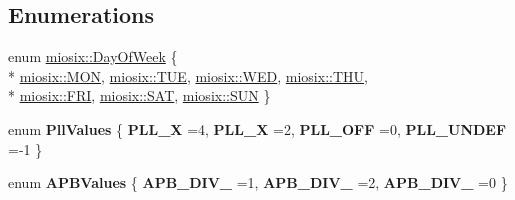 \subsection*{Enumerations}
\begin{DoxyCompactItemize}
\item 
enum \hyperlink{group___hardware_ga24027ab4dbf8557211c0a82fb0dffcbf}{miosix\-::\-Day\-Of\-Week} \{ \\*
\hyperlink{group___hardware_gga24027ab4dbf8557211c0a82fb0dffcbfa962bfb6be11410d30c4406070a19c258}{miosix\-::\-M\-O\-N}, 
\hyperlink{group___hardware_gga24027ab4dbf8557211c0a82fb0dffcbfac3cdcd22d875a6100df4d9b731017962}{miosix\-::\-T\-U\-E}, 
\hyperlink{group___hardware_gga24027ab4dbf8557211c0a82fb0dffcbfab74451ba70e3887ee80b2a610e7ba4a6}{miosix\-::\-W\-E\-D}, 
\hyperlink{group___hardware_gga24027ab4dbf8557211c0a82fb0dffcbfac781efe7eb3004ee537bc9775649873b}{miosix\-::\-T\-H\-U}, 
\\*
\hyperlink{group___hardware_gga24027ab4dbf8557211c0a82fb0dffcbfabd3c27af7a56a1b8c819ed28e62df294}{miosix\-::\-F\-R\-I}, 
\hyperlink{group___hardware_gga24027ab4dbf8557211c0a82fb0dffcbfa79c766ae1d0b17f35209890dd935874c}{miosix\-::\-S\-A\-T}, 
\hyperlink{group___hardware_gga24027ab4dbf8557211c0a82fb0dffcbfad5b4e6dd4a05ccf70b7f72c8716c0208}{miosix\-::\-S\-U\-N}
 \}
\item 
enum {\bfseries Pll\-Values} \{ {\bfseries P\-L\-L\-\_\-X} =4, 
{\bfseries P\-L\-L\-\_\-X} =2, 
{\bfseries P\-L\-L\-\_\-\-O\-F\-F} =0, 
{\bfseries P\-L\-L\-\_\-\-U\-N\-D\-E\-F} =-\/1
 \}
\item 
enum {\bfseries A\-P\-B\-Values} \{ {\bfseries A\-P\-B\-\_\-\-D\-I\-V\-\_} =1, 
{\bfseries A\-P\-B\-\_\-\-D\-I\-V\-\_} =2, 
{\bfseries A\-P\-B\-\_\-\-D\-I\-V\-\_} =0
 \}
\end{DoxyCompactItemize}
